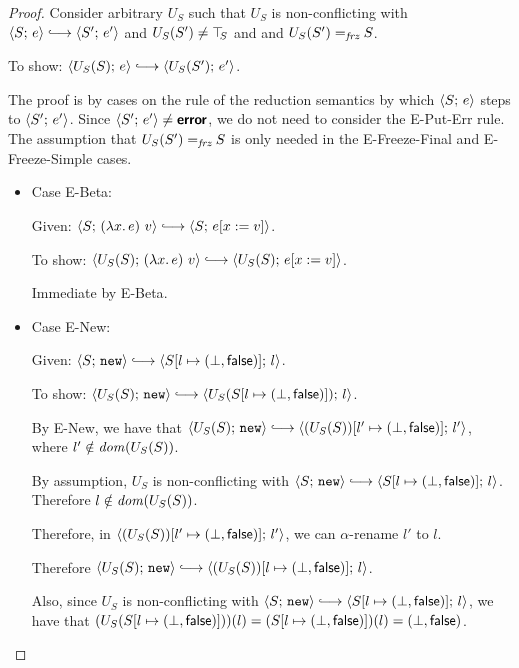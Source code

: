 \begin{proof}
  Consider arbitrary $U_S$ such that $U_S$ is non-conflicting with
  $\config{S}{e} \parstepsto \config{S'}{e'}$ and $U_S(S') \neq \top\hspace{-0.85mm}_{S}$
  and and $U_S(S') =_{\textit{frz}} S$.

  To show: $\config{U_S(S)}{e} \parstepsto \config{U_S(S')}{e'}$.

  The proof is by cases on the rule of the reduction semantics by
  which $\langle S;\, e \rangle$ steps to $\langle S';\, e' \rangle$.  Since
  $\langle S';\, e' \rangle \neq \textbf{\textsf{error}}$, we do not need to consider the {\sc
    E-Put-Err} rule.  The assumption that $U_S(S') =_{\textit{frz}} S$ is
  only needed in the {\sc E-Freeze-Final} and {\sc E-Freeze-Simple}
  cases.

  \begin{itemize}

    \item Case {\sc E-Beta}:

      Given: $\config{S}{\app{(\lam{x}{e})}{v}} \parstepsto
      \config{S}{\subst{e}{x}{v}}$.

      To show: $\config{U_S(S)}{\app{(\lam{x}{e})}{v}} \parstepsto
      \config{U_S(S)}{\subst{e}{x}{v}}$.

      Immediate by {\sc E-Beta}.

    \item Case {\sc E-New}:

      Given: $\config{S}{\NEW} \parstepsto
      \config{\extS{S}{l}{\bot}{\frozenfalse}}{l}$.

      To show: $\config{U_S(S)}{\NEW} \parstepsto
      \config{U_S(\extS{S}{l}{\bot}{\frozenfalse})}{l}$.

      By {\sc E-New}, we have that $\config{U_S(S)}{\NEW} \parstepsto
      \config{\extS{(U_S(S))}{l'}{\bot}{\frozenfalse}}{l'}$, where $l'
      \notin \mathit{dom}(U_S(S))$.

      By assumption, $U_S$ is non-conflicting with $\config{S}{\NEW}
      \parstepsto \config{\extS{S}{l}{\bot}{\frozenfalse}}{l}$.
      Therefore $l \notin \mathit{dom}(U_S(S))$.

      Therefore, in
      $\langle (U_S(S))[l' \mapsto (\bot, \textsf{false})];\, l' \rangle$, we
      can $\alpha$-rename $l'$ to $l$.

      Therefore $\config{U_S(S)}{\NEW} \parstepsto
      \config{\extS{(U_S(S))}{l}{\bot}{\frozenfalse}}{l}$.

      Also, since $U_S$ is non-conflicting with $\config{S}{\NEW}
      \parstepsto \config{\extS{S}{l}{\bot}{\frozenfalse}}{l}$, we
      have that $(U_S(S[l \mapsto (\bot, \textsf{false})]))(l) =
      (S[l \mapsto (\bot, \textsf{false})])(l) =
      (\bot, \textsf{false})$.


\end{itemize}
\end{proof}
